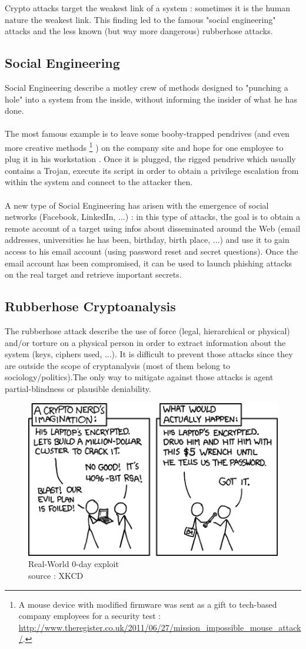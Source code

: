 Crypto attacks target the weakest link of a system : sometimes it is the human nature the weakest link. This finding led to the famous "social engineering" attacks and the less known (but way more dangerous) rubberhose attacks.

\subsection{Social Engineering}

Social Engineering describe a motley crew of methods designed to "punching a hole" into a system from the inside, without informing the insider of what he has done. \\\\
The most famous example is to leave some booby-trapped pendrives (and even more creative methods 
\footnote{ A mouse device with modified firmware was sent as a gift to tech-based company employees for a security test : \url{ http://www.theregister.co.uk/2011/06/27/mission_impossible_mouse_attack/}.  }
) on the company site and hope for one employee to plug it in his workstation . Once it is plugged, the rigged pendrive which usually contains a Trojan, execute its script in order to obtain a privilege escalation from within the system and connect to the attacker then.\\\\
A new type of Social Engineering has arisen with the emergence of social networks (Facebook, LinkedIn, ...) : in this type of attacks, the goal is to obtain a remote account of a target using infos about disseminated around the Web (email addresses, universities he has been, birthday, birth place, ...) and use it to gain access to his email account (using password reset and secret questions). Once the email account has been compromised, it can be used to launch phishing attacks on the real target and retrieve important secrets.


\subsection{Rubberhose Cryptoanalysis}

The rubberhose attack describe the use of force (legal, hierarchical or physical) and/or torture on a physical person in order to extract information about the system (keys, ciphers used, ...). It is difficult to prevent those attacks since they are outside the scope of cryptanalysis (most of them belong to sociology/politics).The only way to mitigate against those attacks is agent partial-blindness or plausible deniability.

\begin{figure}[hb!]
    \centering
       \includegraphics{images/rubberhose.png}
	\caption{ Real-World 0-day exploit \\ source : XKCD}
	\label{fig:RC4}
\end{figure}